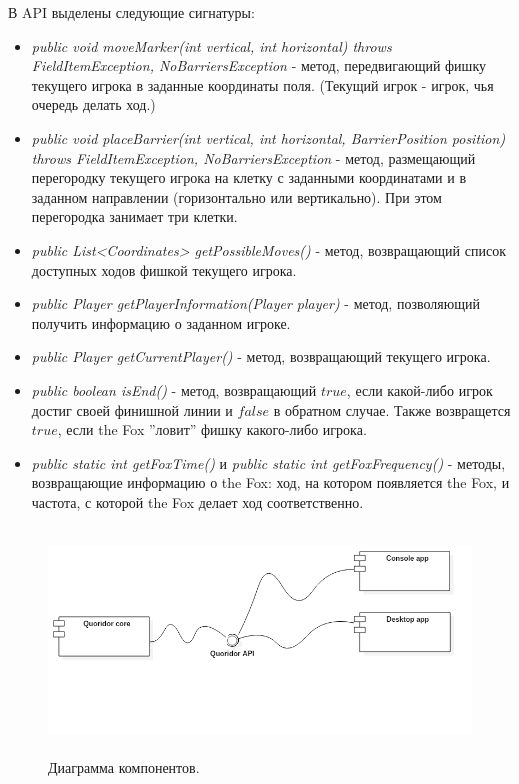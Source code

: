 \documentclass[a4paper]{article}
\begin{document}
\noindent В API выделены следующие сигнатуры:
\begin{itemize}
\item \textit{public void moveMarker(int vertical, int horizontal)
            throws FieldItemException, NoBarriersException} - метод, передвигающий фишку текущего игрока в заданные координаты поля. (Текущий игрок - игрок, чья очередь делать ход.)
\item \textit{public void placeBarrier(int vertical, int horizontal, BarrierPosition position)
            throws FieldItemException, NoBarriersException} - метод, размещающий перегородку текущего игрока на клетку с заданными координатами и в заданном направлении (горизонтально или вертикально). При этом перегородка занимает три клетки. 
\item \textit{public List<Coordinates> getPossibleMoves()} - метод, возвращающий список доступных ходов фишкой текущего игрока.
\item \textit{public Player getPlayerInformation(Player player)} - метод, позволяющий получить информацию о заданном игроке.
\item \textit{public Player getCurrentPlayer()} - метод, возвращающий текущего игрока.
\item \textit{public boolean isEnd()} - метод, возвращающий $true$, если какой-либо игрок достиг своей финишной линии и $false$ в обратном случае. Также возвращется $true$, если the Fox ''ловит'' фишку какого-либо игрока.
\item \textit{public static int getFoxTime()} и \textit{public static int getFoxFrequency()} - методы, возвращающие информацию о the Fox: ход, на котором появляется the Fox, и частота, с которой the Fox делает ход соответственно.
\end{itemize}

\begin{figure}[H]
	\begin{center}
		\includegraphics[scale=0.7, height=6cm]{../pictures/ComponentDiagram.png}
		\caption{Диаграмма компонентов.} 
		\label{pic:componentDiagram} %
	\end{center}
\end{figure}
\end{document}

